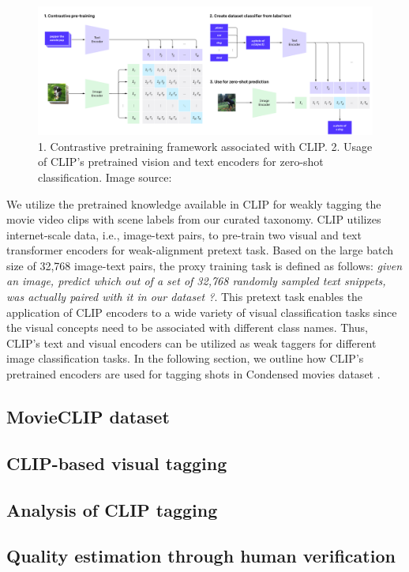 \begin{figure}[h!]
\centering
  \includegraphics[width=\linewidth]{figures/CLIP_outline_diagram.png}
  \caption{1. Contrastive pretraining framework associated with CLIP. 2. Usage of CLIP's pretrained vision and text encoders for zero-shot classification. Image source: \cite{CLIP}}
  \label{CLIP outline}
\end{figure}
We utilize the pretrained knowledge available in CLIP for weakly tagging the movie video clips with scene labels from our curated taxonomy. 
CLIP utilizes internet-scale data, i.e., image-text pairs, to pre-train two visual and text transformer \cite{transformers} encoders for weak-alignment pretext task. Based on the large batch size of 32,768 image-text pairs, the proxy training task is defined as follows: \textit{given an image, predict which out of a set of 32,768 randomly sampled text snippets, was actually paired with it in our dataset ?}. This pretext task enables the application of CLIP encoders to a wide variety of visual classification tasks since the visual concepts need to be associated with different class names. Thus, CLIP's text and visual encoders can be utilized as weak taggers for different image classification tasks. In the following section, we outline how CLIP's pretrained encoders are used for tagging shots in Condensed movies dataset \cite{bain2020condensed}.

\subsection{MovieCLIP dataset}
\subsection{CLIP-based visual tagging}
\subsection{Analysis of CLIP tagging}
\subsection{Quality estimation through human verification}
